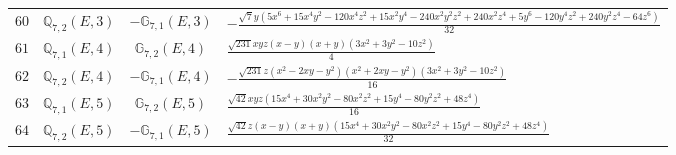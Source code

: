 \documentclass[fleqn,8pt,landscape]{jsarticle}
\begin{document}
\begin{table}[ht!]
\begin{center}
\begin{tabular}{cccl}
$ 60 $ & $ \mathbb{Q}_{7,2}(E,3) $ & $ -\mathbb{G}_{7,1}(E,3) $ & $ - \frac{\sqrt{7} y \left(5 x^{6} + 15 x^{4} y^{2} - 120 x^{4} z^{2} + 15 x^{2} y^{4} - 240 x^{2} y^{2} z^{2} + 240 x^{2} z^{4} + 5 y^{6} - 120 y^{4} z^{2} + 240 y^{2} z^{4} - 64 z^{6}\right)}{32} $ \\
$ 61 $ & $ \mathbb{Q}_{7,1}(E,4) $ & $ \mathbb{G}_{7,2}(E,4) $ & $ \frac{\sqrt{231} x y z \left(x - y\right) \left(x + y\right) \left(3 x^{2} + 3 y^{2} - 10 z^{2}\right)}{4} $ \\
$ 62 $ & $ \mathbb{Q}_{7,2}(E,4) $ & $ -\mathbb{G}_{7,1}(E,4) $ & $ - \frac{\sqrt{231} z \left(x^{2} - 2 x y - y^{2}\right) \left(x^{2} + 2 x y - y^{2}\right) \left(3 x^{2} + 3 y^{2} - 10 z^{2}\right)}{16} $ \\
$ 63 $ & $ \mathbb{Q}_{7,1}(E,5) $ & $ \mathbb{G}_{7,2}(E,5) $ & $ \frac{\sqrt{42} x y z \left(15 x^{4} + 30 x^{2} y^{2} - 80 x^{2} z^{2} + 15 y^{4} - 80 y^{2} z^{2} + 48 z^{4}\right)}{16} $ \\
$ 64 $ & $ \mathbb{Q}_{7,2}(E,5) $ & $ -\mathbb{G}_{7,1}(E,5) $ & $ \frac{\sqrt{42} z \left(x - y\right) \left(x + y\right) \left(15 x^{4} + 30 x^{2} y^{2} - 80 x^{2} z^{2} + 15 y^{4} - 80 y^{2} z^{2} + 48 z^{4}\right)}{32} $ \\
 \hline \hline
\end{tabular}
\end{center}
\end{table}
\end{document}
